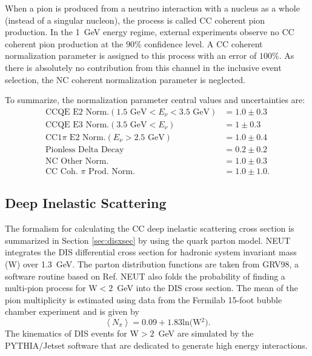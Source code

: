 When a pion is produced from a neutrino interaction with a nucleus as a whole (instead of a singular nucleon), the process is called CC coherent pion production. In the 1~GeV energy regime, external experiments observe no CC coherent pion production at the $90\%$ confidence level. A CC coherent normalization parameter is assigned to this process with an error of $100\%$. As there is absolutely no contribution from this channel in the inclusive event selection, the NC coherent normalization parameter is neglected. 

To summarize, the normalization parameter central values and uncertainties are:
\begin{align}
\text{CCQE E2 Norm.}(1.5\text{~GeV} < E_\nu < 3.5\text{~GeV}) &= 1.0\pm0.3\\
\text{CCQE E3 Norm.}(3.5\text{~GeV} < E_\nu) &= 1\pm0.3\\
\text{CC}1\pi\text{~E2 Norm.}(E_\nu > 2.5\text{~GeV}) &= 1.0\pm0.4\\
\text{Pionless Delta Decay} &= 0.2 \pm 0.2\\
\text{NC Other Norm.} &= 1.0 \pm 0.3\\
\text{CC Coh.~}\pi\text{~Prod. Norm.} &= 1.0 \pm 1.0.
\end{align}

\subsection{Deep Inelastic Scattering}

The formalism for calculating the CC deep inelastic scattering cross section is summarized in Section \ref{sec:disxsec} by using the quark parton model. NEUT integrates the DIS differential cross section for hadronic system invariant mass (W) over 1.3~GeV. The parton distribution functions are taken from GRV98, a software routine based on Ref\cite{GRV98}. NEUT also folds the probability of finding a multi-pion process for W$<2$~GeV into the DIS cross section. The mean of the pion multiplicity is estimated using data from the Fermilab 15-foot bubble chamber experiment and is given by
\begin{equation}
\left<N_\pi\right> = 0.09+1.83 \text{ln(W$^2$)}.
\end{equation}
The kinematics of DIS events for W$>2$~GeV are simulated by the PYTHIA/Jetset software that are dedicated to generate high energy interactions. 

